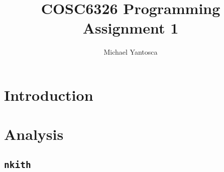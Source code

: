 \documentclass[11pt,epsf]{article}
\date{}
\title{COSC6326 Programming Assignment 1}
\author{Michael Yantosca}
\begin{document}
\maketitle
\tableofcontents

\section{Introduction}{

}

\section{Analysis}{
  \subsection{\texttt{nkith}}{
}}
\end{document}
